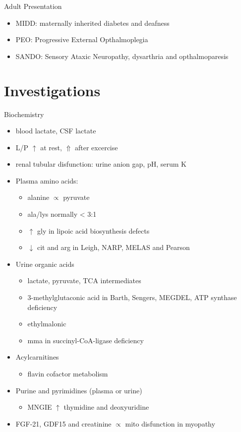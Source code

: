 \documentclass[presentation, smaller]{beamer}
\begin{document}
\begin{frame}[label={sec:org088f710}]{Adult Presentation}
\begin{itemize}
\item MIDD: maternally inherited diabetes and deafness
\item PEO: Progressive External Opthalmoplegia
\item SANDO: Sensory Ataxic Neuropathy, dysarthria and opthalmoparesis
\end{itemize}
\end{frame}

\section{Investigations}
\label{sec:org2381ccc}

\begin{frame}[label={sec:org3e17cea}]{Biochemistry}
\begin{itemize}
\item blood lactate, CSF lactate
\item L/P \(\uparrow\) at rest, \(\Uparrow\) after excercise
\item renal tubular disfunction: urine anion gap, pH, serum K
\item Plasma amino acids:
\begin{itemize}
\item alanine \(\propto\) pyruvate
\item ala/lys normally \textless{} 3:1
\item \(\uparrow\) gly in lipoic acid biosynthesis defects
\item \(\downarrow\) cit and arg in Leigh, NARP, MELAS and Pearson
\end{itemize}
\item Urine organic acids
\begin{itemize}
\item lactate, pyruvate, TCA intermediates
\item 3-methylglutaconic acid in Barth, Sengers, MEGDEL, ATP synthase deficiency
\item ethylmalonic
\item mma in succinyl-CoA-ligase deficiency
\end{itemize}
\item Acylcarnitines
\begin{itemize}
\item flavin cofactor metabolism
\end{itemize}
\item Purine and pyrimidines (plasma or urine)
\begin{itemize}
\item MNGIE \(\uparrow\) thymidine and deoxyuridine
\end{itemize}
\item FGF-21, GDF15 and creatinine \(\propto\) mito disfunction in myopathy
\end{itemize}
\end{frame}
\end{document}

